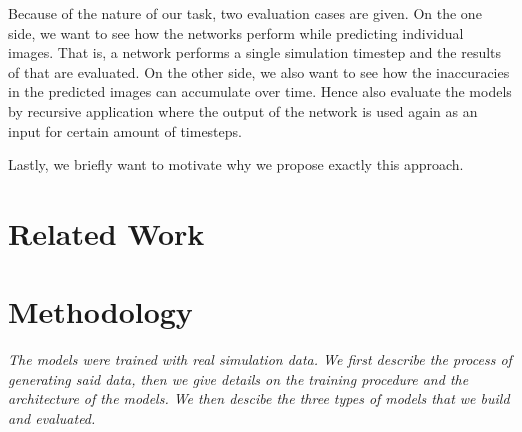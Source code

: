 \documentclass{llncs}
\begin{document}
Because of the nature of our task, two evaluation cases are given. On the one side, we want to see how the networks perform while predicting individual images. That is, a network performs a single simulation timestep and the results of that are evaluated. On the other side, we also want to see how the inaccuracies in the predicted images can accumulate over time. Hence also evaluate the models by recursive application where the output of the network is used again as an input for certain amount of timesteps.

Lastly, we briefly want to motivate why we propose exactly this approach.

\section{Related Work}\label{related_work}

\section{Methodology}\label{methodology}

\emph{The models were trained with real simulation data. We first describe the process of generating said data, then we give details on the training procedure and the architecture of the models. We then descibe the three types of models that we build and evaluated.}
\end{document}
